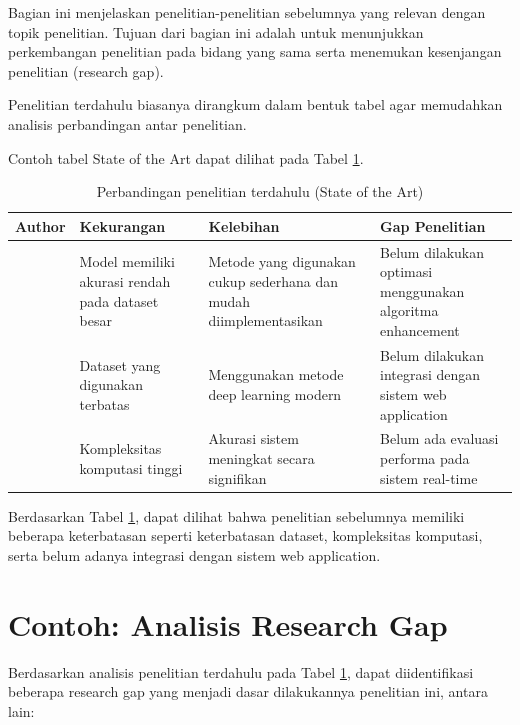 Bagian ini menjelaskan penelitian-penelitian sebelumnya yang relevan dengan
topik penelitian. Tujuan dari bagian ini adalah untuk menunjukkan perkembangan
penelitian pada bidang yang sama serta menemukan kesenjangan penelitian
(research gap).

Penelitian terdahulu biasanya dirangkum dalam bentuk tabel agar memudahkan
analisis perbandingan antar penelitian.

Contoh tabel State of the Art dapat dilihat pada Tabel \ref{tab:sota}.

\begin{table}[H]
\centering
\begin{tabular}{p{3cm} p{3cm} p{3cm} p{4cm}}
\toprule
Author & Kekurangan & Kelebihan & Gap Penelitian \\
\midrule

\cite{rag2023} &
Model memiliki akurasi rendah pada dataset besar &
Metode yang digunakan cukup sederhana dan mudah diimplementasikan &
Belum dilakukan optimasi menggunakan algoritma enhancement

\\

\cite{author2021} &
Dataset yang digunakan terbatas &
Menggunakan metode deep learning modern &
Belum dilakukan integrasi dengan sistem web application

\\

\cite{author2022} &
Kompleksitas komputasi tinggi &
Akurasi sistem meningkat secara signifikan &
Belum ada evaluasi performa pada sistem real-time

\\

\bottomrule
\end{tabular}

\caption{Perbandingan penelitian terdahulu (State of the Art)}
\label{tab:sota}
\end{table}

Berdasarkan Tabel \ref{tab:sota}, dapat dilihat bahwa penelitian sebelumnya
memiliki beberapa keterbatasan seperti keterbatasan dataset, kompleksitas
komputasi, serta belum adanya integrasi dengan sistem web application.

\section{Contoh: Analisis Research Gap}

Berdasarkan analisis penelitian terdahulu pada Tabel \ref{tab:sota}, dapat
diidentifikasi beberapa research gap yang menjadi dasar dilakukannya penelitian
ini, antara lain:

